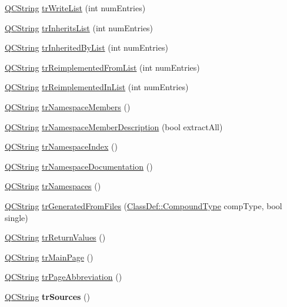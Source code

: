 \begin{DoxyCompactItemize}
\item 
\hyperlink{class_q_c_string}{Q\-C\-String} \hyperlink{class_translator_polish_a1b5fbfc01a1bc458fe53a0292b4b7388}{tr\-Write\-List} (int num\-Entries)
\item 
\hyperlink{class_q_c_string}{Q\-C\-String} \hyperlink{class_translator_polish_a2aae6b7b421f034541d3890c830a5b87}{tr\-Inherits\-List} (int num\-Entries)
\item 
\hyperlink{class_q_c_string}{Q\-C\-String} \hyperlink{class_translator_polish_a1e99444f13f4aaf4381915a7ef64b7e2}{tr\-Inherited\-By\-List} (int num\-Entries)
\item 
\hyperlink{class_q_c_string}{Q\-C\-String} \hyperlink{class_translator_polish_a415a7fcbadfe96bd0ca26878e710c148}{tr\-Reimplemented\-From\-List} (int num\-Entries)
\item 
\hyperlink{class_q_c_string}{Q\-C\-String} \hyperlink{class_translator_polish_a03896d92ba89b64025ceb367fda22ffb}{tr\-Reimplemented\-In\-List} (int num\-Entries)
\item 
\hyperlink{class_q_c_string}{Q\-C\-String} \hyperlink{class_translator_polish_aab3cb0a2b1911abb6aaa26098a2ba334}{tr\-Namespace\-Members} ()
\item 
\hyperlink{class_q_c_string}{Q\-C\-String} \hyperlink{class_translator_polish_aee9c71c61972950fb45524dbecfa54f9}{tr\-Namespace\-Member\-Description} (bool extract\-All)
\item 
\hyperlink{class_q_c_string}{Q\-C\-String} \hyperlink{class_translator_polish_a3366fecf1ff5ff616f74822b96b0d9fb}{tr\-Namespace\-Index} ()
\item 
\hyperlink{class_q_c_string}{Q\-C\-String} \hyperlink{class_translator_polish_a4b378c543e22d6041d618cffdb734842}{tr\-Namespace\-Documentation} ()
\item 
\hyperlink{class_q_c_string}{Q\-C\-String} \hyperlink{class_translator_polish_abb4bb29699b00eecd57abd489abbffd0}{tr\-Namespaces} ()
\item 
\hyperlink{class_q_c_string}{Q\-C\-String} \hyperlink{class_translator_polish_a2c9f8ab8b1a6ef2b514ceaf4f2fbfcdb}{tr\-Generated\-From\-Files} (\hyperlink{class_class_def_a768a6f0a6fd7e9087ff7971abbcc3f36}{Class\-Def\-::\-Compound\-Type} comp\-Type, bool single)
\item 
\hyperlink{class_q_c_string}{Q\-C\-String} \hyperlink{class_translator_polish_a6e464db5f9409cf3e05373c732034db5}{tr\-Return\-Values} ()
\item 
\hyperlink{class_q_c_string}{Q\-C\-String} \hyperlink{class_translator_polish_a55afa9d76071992e385357f6cffb37ae}{tr\-Main\-Page} ()
\item 
\hyperlink{class_q_c_string}{Q\-C\-String} \hyperlink{class_translator_polish_a4248866912d235cac5f7336db70fff9a}{tr\-Page\-Abbreviation} ()
\item 
\hypertarget{class_translator_polish_a8a8a4eea0a0a208d7335745a34caedc3}{\hyperlink{class_q_c_string}{Q\-C\-String} {\bfseries tr\-Sources} ()}\label{class_translator_polish_a8a8a4eea0a0a208d7335745a34caedc3}


\end{DoxyCompactItemize}
